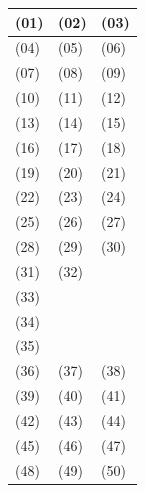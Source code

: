 \noindent\renewcommand{\arraystretch}{1.8}
  \begin{tabular}{|m{0.33\linewidth}|m{0.33\linewidth}|m{0.33\linewidth}|}
      \hline
      \quad\quad(01)&\:\:\:(02)&\:\:\:(03) \\ \hline
      \quad\quad(04)&\:\:\:(05)&\:\:\:(06) \\ \hline
      \quad\quad(07)&\:\:\:(08)&\:\:\:(09) \\ \hline
      \quad\quad(10)&\:\:\:(11)&\:\:\:(12) \\ \hline
      \quad\quad(13)&\:\:\:(14)&\:\:\:(15) \\ \hline
      \quad\quad(16)&\:\:\:(17)&\:\:\:(18) \\ \hline
      \quad\quad(19)&\:\:\:(20)&\:\:\:(21) \\ \hline
      \quad\quad(22)&\:\:\:(23)&\:\:\:(24) \\ \hline
      \quad\quad(25)&\:\:\:(26)&\:\:\:(27) \\ \hline
      \quad\quad(28)&\:\:\:(29)&\:\:\:(30) \\ \hline
      \quad\quad(31)&\:\:\:(32)& \\ \hline
      \multicolumn{3}{|m{\linewidth}|}{(33)} \\ \hline
      \multicolumn{3}{|m{\linewidth}|}{(34)} \\ \hline
      \multicolumn{3}{|m{\linewidth}|}{(35)} \\ \hline
      \quad\quad(36)&\:\:\:(37)&\:\:\:(38) \\ \hline
      \quad\quad(39)&\:\:\:(40)&\:\:\:(41) \\ \hline
      \quad\quad(42)&\:\:\:(43)&\:\:\:(44) \\ \hline
      \quad\quad(45)&\:\:\:(46)&\:\:\:(47) \\ \hline
      \quad\quad(48)&\:\:\:(49)&\:\:\:(50) \\ \hline
    \end{tabular}